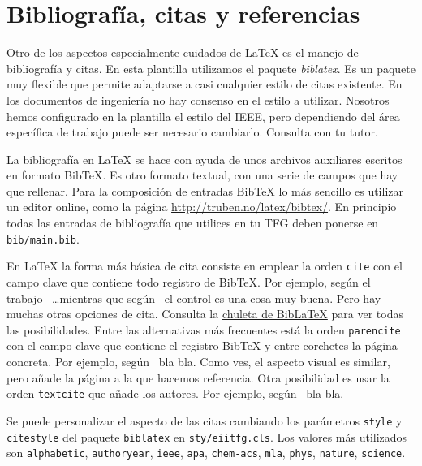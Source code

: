 \section{Bibliografía, citas y referencias} 
\label{sec:bibliografia-citas}

Otro de los aspectos especialmente cuidados de \LaTeX{} es el manejo de bibliografía y citas.  En esta plantilla utilizamos el paquete \emph{biblatex}.  Es un paquete muy flexible que permite adaptarse a casi cualquier estilo de citas existente.  En los documentos de ingeniería no hay consenso en el estilo a utilizar.  Nosotros hemos configurado en la plantilla el estilo del IEEE, pero dependiendo del área específica de trabajo puede ser necesario cambiarlo. Consulta con tu tutor.

La bibliografía en \LaTeX{} se hace con ayuda de unos archivos auxiliares escritos en formato BibTeX.  Es otro formato textual, con una serie de campos que hay que rellenar.  Para la composición de entradas BibTeX lo más sencillo es utilizar un editor online, como la página \url{http://truben.no/latex/bibtex/}.  En principio todas las entradas de bibliografía que utilices en tu TFG deben ponerse en \texttt{bib/main.bib}.

En \LaTeX{} la forma más básica de cita consiste en emplear la orden \texttt{cite} con el campo clave que contiene todo registro de BibTeX.  Por ejemplo, según el trabajo~\cite{armas2011estimation} \ldots mientras que según~\cite{castillo2010design} el control es una cosa muy buena.  Pero hay muchas otras opciones de cita.  Consulta la \href{http://tug.ctan.org/info/biblatex-cheatsheet/biblatex-cheatsheet.pdf}{chuleta de Bib\LaTeX} para ver todas las posibilidades.  Entre las alternativas más frecuentes está la orden \texttt{parencite} con el campo clave que contiene el registro BibTeX y entre corchetes la página concreta.  Por ejemplo, según~\parencite[3]{armas2011estimation} bla bla.  Como ves, el aspecto visual es similar, pero añade la página a la que hacemos referencia.  Otra posibilidad es usar la orden \texttt{textcite} que añade los autores.  Por ejemplo, según~\textcite{armas2011estimation} bla bla.

Se puede personalizar el aspecto de las citas cambiando los parámetros \texttt{style} y \texttt{citestyle} del paquete \texttt{biblatex} en \texttt{sty/eiitfg.cls}.  Los valores más utilizados son \texttt{alphabetic}, \texttt{authoryear}, \texttt{ieee}, \texttt{apa}, \texttt{chem-acs}, \texttt{mla}, \texttt{phys}, \texttt{nature}, \texttt{science}.

